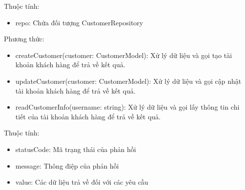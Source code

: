 Thuộc tính:
\begin{itemize}
	\item repo: Chứa đối tượng CustomerRepository
\end{itemize}
Phương thức:
\begin{itemize}
	\item createCustomer(customer: CustomerModel): Xử lý dữ liệu và gọi tạo tài khoản khách hàng để trả về kết quả.
	\item updateCustomer(customer: CustomerModel): Xử lý dữ liệu và gọi cập nhật tài khoản khách hàng để trả về kết quả.
	\item readCustomerInfo(username: string): Xử lý dữ liệu và gọi lấy thông tin chi tiết của tài khoản khách hàng để trả về kết quả.
\end{itemize}

Thuộc tính:
\begin{itemize}
	\item statusCode: Mã trạng thái của phản hồi
	\item message: Thông điệp của phản hồi
	\item value: Các dữ liệu trả về đối với các yêu cầu
\end{itemize}

\newpage


